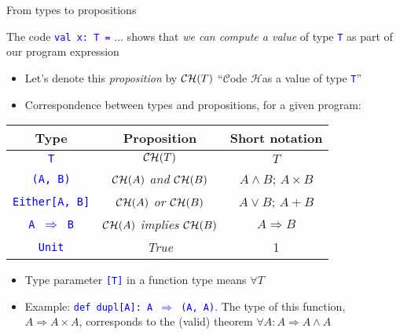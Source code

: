 \documentclass[english]{beamer}
\providecommand{\tabularnewline}{\\}
\begin{document}
\begin{frame}{From types to propositions}

The code \texttt{\textcolor{blue}{\footnotesize{}val x:\ T =}} ...
shows that \emph{we can compute a value} of type \texttt{\textcolor{blue}{\footnotesize{}T}}
as part of our program expression
\begin{itemize}
\item Let's denote this \emph{proposition} by ${\cal CH}(T)$ \textendash{}
``$\mathcal{C}$ode $\mathcal{H}$as a value of type \texttt{\textcolor{blue}{\footnotesize{}T}}''
\item Correspondence between types and propositions, for a given program:
\end{itemize}
\begin{center}
\begin{tabular}{|c|c|c|}
\hline 
\textbf{Type} &
\textbf{Proposition} &
\textbf{Short notation}\tabularnewline
\hline 
\hline 
\texttt{\textcolor{blue}{\footnotesize{}T}} &
${\cal CH}(T)$ &
$T$\tabularnewline
\hline 
\texttt{\textcolor{blue}{\footnotesize{}(A, B)}} &
${\cal CH}(A)$ \emph{and} ${\cal CH}(B)$ &
$A\wedge B$; $A\times B$\tabularnewline
\hline 
\texttt{\textcolor{blue}{\footnotesize{}Either{[}A, B{]}}} &
${\cal CH}(A)$ \emph{or} ${\cal CH}(B)$ &
$A\vee B$; $A+B$\tabularnewline
\hline 
\texttt{\textcolor{blue}{\footnotesize{}A $\Rightarrow$ B}} &
${\cal CH}(A)$ \emph{implies} ${\cal CH}(B)$ &
$A\Rightarrow B$\tabularnewline
\hline 
\texttt{\textcolor{blue}{\footnotesize{}Unit}} &
\emph{True} &
1\tabularnewline
\hline 
\end{tabular}
\par\end{center}
\begin{itemize}
\item Type parameter \texttt{\textcolor{blue}{\footnotesize{}{[}T{]}}} in
a function type means $\forall T$
\item Example: \texttt{\textcolor{blue}{\footnotesize{}def dupl{[}A{]}:\ A
$\Rightarrow$ (A, A)}}. The type of this function, $A\Rightarrow A\times A$,
corresponds to the (valid) theorem $\forall A:A\Rightarrow A\wedge A$
\end{itemize}
\end{frame}
\end{document}
